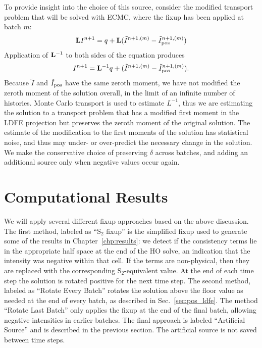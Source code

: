 To provide insight into the choice of this source, consider the modified transport problem
that will be solved with ECMC, where the fixup has been applied at batch $m$:
\begin{equation}
   \mathbf{L} I^{n+1} = q + \mathbf{L}(\tilde{I}^{n+1,(m)} -
    \tilde{I}^{n+1,(m)}_{\text{pos}})
\end{equation}
Application of $\mathbf{L}^{-1}$ to both sides of the equation produces
\begin{equation}
    I^{n+1} = \mathbf{L}^{-1} q + (\tilde{I}^{n+1,(m)} -
    \tilde{I}^{n+1,(m)}_{\text{pos}}).
\end{equation}
Because $\tilde I$ and $\tilde I_{\text{pos}}$ have the same zeroth moment, we have not modified
the zeroth moment of the solution overall, in the limit of an infinite number of histories.  Monte Carlo transport is used to estimate $L^{-1}$, thus 
we are estimating the solution to a transport problem that has a modified first moment in the LDFE projection but preserves the
zeroth moment of the original solution.  The estimate of the modification to the first
moments of the solution has statistical noise, and thus may under- or over-predict the
necessary change in the solution.  We make the conservative choice of preserving $\delta$
across batches, and adding an additional source only when negative values occur again. 

\section{Computational Results}

We will apply several different fixup approaches based on the above discussion.
The first method, labeled as ``S$_2$ fixup'' is the simplified fixup used to generate some
of the results in Chapter~\ref{chp:results}: we detect if
the consistency terms lie in the appropriate half space at the end of the HO solve,
an indication that the intensity was negative within that cell.  If the terms are non-physical, then
they are replaced with the corresponding S$_2$-equivalent value. At the end of each time
step the solution is rotated positive for the next time step.  The second method, labeled
as ``Rotate Every Batch'' rotates the solution above the floor value as needed at the end of every batch, as
described in Sec.~\ref{sec:pos_ldfe}.  The method ``Rotate Last Batch'' only applies the
fixup at the end of the final batch, allowing negative intensities in earlier batches.
The final approach is labeled ``Artificial Source'' and is described in the previous
section.  The artificial source is not saved
between time steps.

